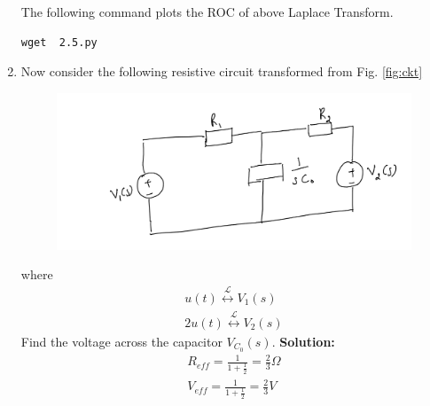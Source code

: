 \documentclass[journal,12pt,twocolumn]{IEEEtran}
\newcommand{\solution}{\noindent \textbf{Solution: }}
\providecommand{\system}[1]{\overset{\mathcal{#1}}{ \longleftrightarrow}}
\numberwithin{equation}{section}
\renewcommand\thesection{\arabic{section}}
\begin{document}
\begin{enumerate}[label=\arabic*.,ref=\thesection.\theenumi]
		The following command plots the ROC of above Laplace Transform.
	\begin{lstlisting}
wget  2.5.py	
\end{lstlisting}
		\begin{figure}[!ht]
			\centering
			\caption{}
			\label{fig:roc2}
\end{figure}
	\item Now consider the following resistive circuit transformed from 
			Fig. \ref{fig:ckt}
		\begin{figure}[!ht]
			\centering
			\includegraphics[width=\columnwidth]{figs/lap-ckt.jpg}
			\caption{}
			\label{fig:lap-ckt}
\end{figure}
		where 
		\begin{align}
			u(t) \system{L} V_1(s)
			\\
			2u(t) \system{L} V_2(s)
		\end{align}
		Find the voltage across the capacitor $V_{C_0}(s)$.
		\solution
		\begin{align}
		R_{eff}=\frac{1}{1+\frac{1}{2}}
		=\frac{2}{3} \Omega\\
		V_{eff}=\frac{1}{1+\frac{1}{2}}
		=\frac{2}{3} V
		\end{align}
	

\end{enumerate}
\end{document}
